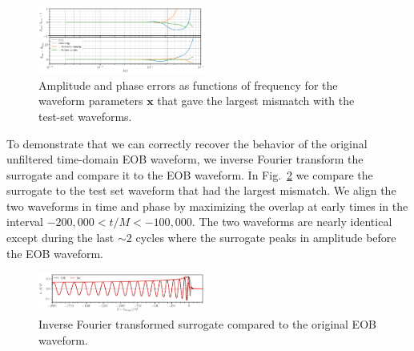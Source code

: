\documentclass[prd,aps,letter,twocolumn,floatfix,notitlepage,nofootinbib]{revtex4-1}
\def\bx{\mathbf{x}}
\begin{document}
\begin{figure}[htb]
\centering
\includegraphics[width=0.49\textwidth]{htildemaxerror.png}
\caption{Amplitude and phase errors as functions of frequency for the waveform parameters $\bx$ that gave the largest mismatch with the test-set waveforms.}
\label{fig:maxmismatch}
\end{figure}

To demonstrate that we can correctly recover the behavior of the original unfiltered time-domain EOB waveform, we inverse Fourier transform the surrogate and compare it to the EOB waveform. In Fig.~\ref{fig:maxmismatchtd} we compare the surrogate to the test set waveform that had the largest mismatch. We align the two waveforms in time and phase by maximizing the overlap at early times in the interval $-200,000 < t/M < -100,000$. The two waveforms are nearly identical except during the last $\sim 2$ cycles where the surrogate peaks in amplitude before the EOB waveform.

\begin{figure}[htb]
\centering
\includegraphics[width=0.49\textwidth]{hmaxerror.png}
\caption{Inverse Fourier transformed surrogate compared to the original EOB waveform.}
\label{fig:maxmismatchtd}
\end{figure}













%
%
%
\end{document}
